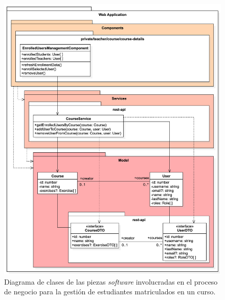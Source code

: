 \begin{figure}[h!p]
    \centering
    \includegraphics[width=\textwidth]{imagenes/utilizadas/4-2-arquitectura/diagramas/diag3-mvcAppWebEjemplo.png}
    \caption{Diagrama de clases de las piezas \textit{software} involucradas en el proceso de negocio para la gestión de estudiantes matriculados en un curso.}
    \label{fig:mvcAppWeb}
\end{figure}

